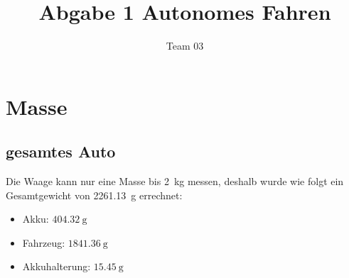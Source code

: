 \documentclass[10pt]{article}
\author{Team 03}
\title{Abgabe 1 Autonomes Fahren}
\begin{document}
\maketitle

\section{Masse}
    \subsection{gesamtes Auto}
    Die Waage kann nur eine Masse bis \SI{2}{\kilogram} messen, deshalb wurde wie folgt ein Gesamtgewicht von \SI{2261,13}{\gram} errechnet:
    \begin{multicols}{3}
    \begin{itemize}
        \item Akku: $\SI{404,32}{\gram}$
        \item Fahrzeug: $\SI{1841,36}{\gram}$
        \item Akkuhalterung: $\SI{15,45}{\gram}$
    \end{itemize}
    \end{multicols}
\end{document}
